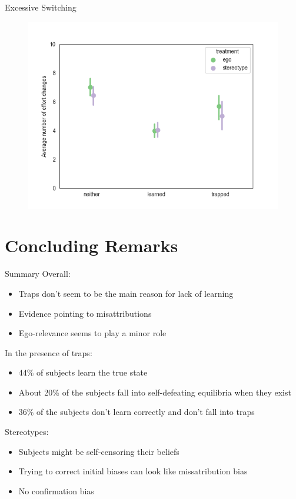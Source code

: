 \documentclass[aspectratio=169]{beamer}
\begin{document}
\begin{frame}{Excessive Switching}
    \begin{figure}
        \centering
        \includegraphics[scale=.5]{switching.png}
    \end{figure}

\end{frame}


\section*{Concluding Remarks}

\begin{frame}{Summary}
Overall:\\
    \begin{itemize}
        \item Traps don't seem to be the main reason for lack of learning
        \item Evidence pointing to misattributions
        \item Ego-relevance seems to play a minor role
    \end{itemize}
    \bigskip
In the presence of traps:\\
    \begin{itemize}
        \item 44\% of subjects learn the true state
        \item About 20\% of the subjects fall into self-defeating equilibria when they exist
        \item 36\% of the subjects don't learn correctly and don't fall into traps
    \end{itemize} 
\bigskip
Stereotypes:\\
    \begin{itemize}
        \item Subjects might be self-censoring their beliefs
        \item Trying to correct initial biases can look like missatribution bias
        \item No confirmation bias
    \end{itemize}
\end{frame}
\end{document}
